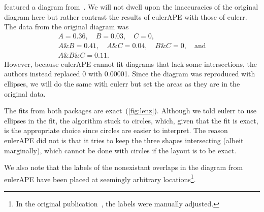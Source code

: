 \documentclass[
  oneside,
  openany,
  numbers=noendperiod,
  parskip=half,
  bibliography=totoc
]{scrbook}\usepackage[]{graphicx}\usepackage{xcolor}
\newcommand{\pkg}[1]{{\fontseries{b}\selectfont #1}}
\begin{document}
\citet{Micallef_2014a} featured a diagram from~\citet{Lenz_2006}. We will not
dwell upon the inaccuracies of the original diagram here but rather
contrast the results of \pkg{eulerAPE} with those of \pkg{eulerr}. The
data from the original diagram was
\begin{gather*}
A = 0.36,\quad B = 0.03,\quad C = 0,\\
A\&B = 0.41,\quad A\&C = 0.04,\quad B\&C = 0,\quad\text{and}\\
A\&B\&C = 0.11.
\end{gather*}
However, because \pkg{eulerAPE} cannot fit diagrams that lack some intersections,
the authors instead replaced 0 with 0.00001. Since the diagram was reproduced with
ellipses, we will do the same with \pkg{eulerr} but set the
areas as they are in the original data.

The fits from both packages are exact~(\cref{fig:lenz}). Although
we told \pkg{eulerr} to use ellipses in the fit, the algorithm stuck to
circles, which, given that the fit is exact, is the appropriate choice
since circles are easier to interpret.
The reason \pkg{eulerAPE} did not is that it tries to keep the three
shapes intersecting (albeit marginally), which cannot be done
with circles if the layout is to be exact.

We also note that the labels of the nonexistant overlaps in the diagram from
\pkg{eulerAPE} have been placed at seemingly arbitrary locations\footnote{In
the original publication~\citep{Micallef_2014a}, the labels were manually
adjusted.}.
\end{document}
